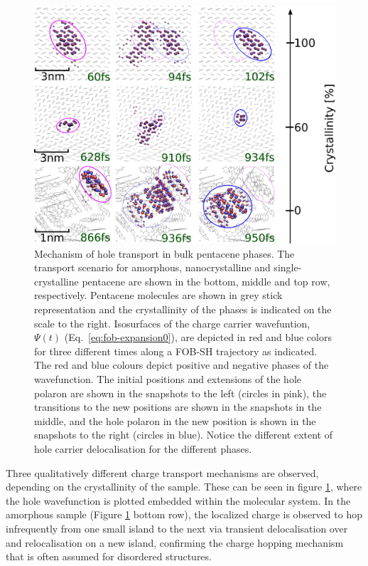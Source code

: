 \begin{figure}[htp]
  \includegraphics[width=\linewidth]{../img/DifferentQuenchTimes/ipr_3_samples.png}
  \caption{\label{fig:IPR}
  Mechanism of hole transport in bulk pentacene phases.
   The transport scenario for amorphous, nanocrystalline and single-crystalline pentacene are shown in the bottom, middle
  and top row, respectively. Pentacene molecules are shown in grey stick representation and the crystallinity of the phases is indicated on the scale to the right.
  Isosurfaces of the charge carrier wavefuntion, $\Psi (t)$ (Eq.~\ref{eq:fob-expansion0}), are depicted in red and blue colors for three different times along a FOB-SH trajectory
	as indicated. The red and blue colours depict positive and negative phases of the wavefunction. The initial positions and extensions of the hole polaron are shown in the snapshots to the left (circles in pink), the transitions to the
  new positions are shown in the snapshots in the middle, and the hole polaron in the new position is shown in the snapshots to the right (circles in blue).
  Notice the different extent of hole carrier delocalisation for the different phases.}
\end{figure}
Three qualitatively different charge transport mechanisms are observed, depending on the crystallinity of the sample. These can be seen in figure \ref{fig:IPR}, where the hole wavefunction is plotted embedded within the molecular system.
In the amorphous sample (Figure \ref{fig:IPR} bottom row), the localized charge is observed to hop infrequently from one small island to the next via transient
delocalisation over and relocalisation on a new island, confirming the charge hopping mechanism that is often assumed for disordered structures.
